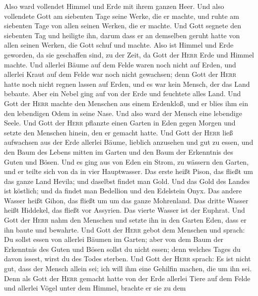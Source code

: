  Also ward vollendet Himmel und Erde mit ihrem ganzen
Heer.  Und also vollendete Gott am siebenten Tage seine
Werke, die er machte, und ruhte am siebenten Tage von allen seinen
Werken, die er machte.  Und Gott segnete den siebenten Tag
und heiligte ihn, darum dass er an demselben geruht hatte von allen
seinen Werken, die Gott schuf und machte.  Also ist Himmel
und Erde geworden, da sie geschaffen sind, zu der Zeit, da Gott der
\textsc{Herr} Erde und Himmel machte.  Und allerlei Bäume
auf dem Felde waren noch nicht auf Erden, und allerlei Kraut auf dem
Felde war noch nicht gewachsen; denn Gott der \textsc{Herr} hatte noch
nicht regnen lassen auf Erden, und es war kein Mensch, der das Land
bebaute.  Aber ein Nebel ging auf von der Erde und
feuchtete alles Land.  Und Gott der \textsc{Herr} machte
den Menschen aus einem Erdenkloß, und er blies ihm ein den lebendigen
Odem in seine Nase. Und also ward der Mensch eine lebendige Seele.
 Und Gott der \textsc{Herr} pflanzte einen Garten in Eden
gegen Morgen und setzte den Menschen hinein, den er gemacht hatte.
 Und Gott der \textsc{Herr} ließ aufwachsen aus der Erde
allerlei Bäume, lieblich anzusehen und gut zu essen, und den Baum des
Lebens mitten im Garten und den Baum der Erkenntnis des Guten und Bösen.
 Und es ging aus von Eden ein Strom, zu wässern den
Garten, und er teilte sich von da in vier Hauptwasser. 
Das erste heißt Pison, das fließt um das ganze Land Hevila; und daselbst
findet man Gold.  Und das Gold des Landes ist köstlich;
und da findet man Bedellion und den Edelstein Onyx.  Das
andere Wasser heißt Gihon, das fließt um um das ganze Mohrenland.
 Das dritte Wasser heißt Hiddekel, das fließt vor
Assyrien. Das vierte Wasser ist der Euphrat.  Und Gott
der \textsc{Herr} nahm den Menschen und setzte ihn in den Garten Eden,
dass er ihn baute und bewahrte.  Und Gott der
\textsc{Herr} gebot dem Menschen und sprach: Du sollst essen von
allerlei Bäumen im Garten;  aber von dem Baum der
Erkenntnis des Guten und Bösen sollst du nicht essen; denn welches Tages
du davon issest, wirst du des Todes sterben.  Und Gott
der \textsc{Herr} sprach: Es ist nicht gut, dass der Mensch allein sei;
ich will ihm eine Gehilfin machen, die um ihn sei.  Denn
als Gott der \textsc{Herr} gemacht hatte von der Erde allerlei Tiere auf
dem Felde und allerlei Vögel unter dem Himmel, brachte er sie zu dem
